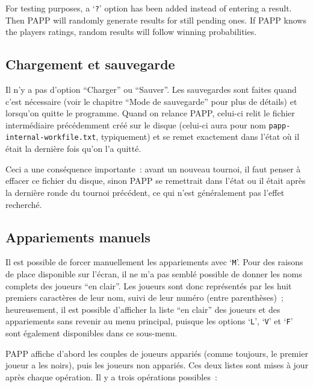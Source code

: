 \documentclass[10pt]{article}
\begin{document}
For testing purposes, a `\verb|?|' option has been added instead of entering a result. Then PAPP will randomly generate results for still pending ones. If PAPP knows the players ratings, random results will follow winning probabilities.




\subsection{Chargement et sauvegarde} \label{inter}

	Il n'y a pas d'option ``Charger'' ou ``Sauver''.  Les
sauvegardes sont faites quand c'est nécessaire (voir le chapitre
``Mode de sauvegarde'' pour plus de détails) et lorsqu'on quitte le
programme.  Quand on relance PAPP, celui-ci relit le fichier
intermédiaire précédemment créé sur le disque (celui-ci
aura pour nom \verb|papp-internal-workfile.txt|, typiquement) et se remet exactement
dans l'état o\`u il était la dernière fois qu'on l'a quitté.

	Ceci a une conséquence importante~: avant un nouveau tournoi,
il faut penser à effacer ce fichier du disque, sinon PAPP se remettrait
dans l'état ou il était après la dernière ronde du tournoi
précédent, ce qui n'est généralement pas l'effet recherché.

\subsection{Appariements manuels}

Il est possible de forcer manuellement les appariements avec 
`\verb|M|'.  Pour des raisons de place disponible sur l'écran, il ne 
m'a pas semblé possible de donner les noms complets des joueurs ``en 
clair''.  Les joueurs sont donc représentés par les huit premiers 
caractères de leur nom, suivi de leur numéro (entre 
parenthèses)~; heureusement, il est possible d'afficher la liste ``en 
clair'' des joueurs et des appariements sans revenir au menu 
principal, puisque les options `\verb|L|', `\verb|V|' et `\verb|F|' 
sont également disponibles dans ce sous-menu.

	PAPP affiche d'abord les couples de joueurs appariés (comme
toujours, le premier joueur a les noirs), puis les joueurs non
appariés.  Ces deux listes sont mises à jour après chaque
opération.  Il y a trois opérations possibles~:
\end{document}
